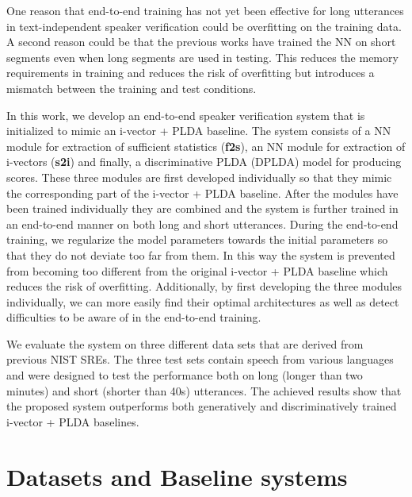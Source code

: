 \documentclass{article}
\begin{document}
One reason that end-to-end training has not yet been effective for long utterances in text-independent speaker verification could be overfitting on the training data. 
A second reason could be that the previous works have trained the NN on short segments even when long segments are used in testing. This reduces the memory requirements in training and reduces the risk of overfitting but introduces a mismatch between the training and test conditions.

In this work, we develop an end-to-end speaker verification system that is initialized to mimic an i-vector + PLDA baseline.
The system consists of a NN module for extraction of sufficient statistics ({\bf f2s}), an NN module for extraction of i-vectors ({\bf s2i}) and finally, a discriminative PLDA (DPLDA) model \cite{BurgetL_ICASSP:2011,Cumani-pairwise} for producing scores. These three modules are first developed individually so that they mimic the corresponding part of the i-vector + PLDA baseline. After the modules have been trained individually they are combined and the system is further trained in an end-to-end manner on both long and short utterances. During the end-to-end training, we regularize the model parameters towards the initial parameters so that they do not deviate too far from them. In this way the system is prevented from becoming too different from the original i-vector + PLDA baseline which reduces the risk of overfitting. 
Additionally, by first developing the three modules individually, we can more easily find their optimal architectures as well as detect difficulties to be aware of in the end-to-end training.

We evaluate the system on three different data sets that are derived from previous NIST SREs. The three test sets contain speech from various languages and were designed to test the performance both on long (longer than two minutes) and short (shorter than 40s) utterances. The achieved results show that the proposed system outperforms both generatively and discriminatively trained i-vector + PLDA baselines.  

\section{Datasets and Baseline systems}
\label{data}
\end{document}
